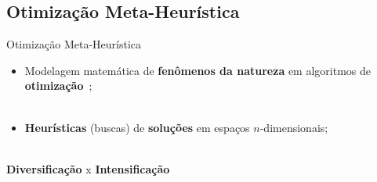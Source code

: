 \subsection{Otimização Meta-Heurística}
\label{ss.optimization_mh}

\begin{frame}{Otimização Meta-Heurística}
	\begin{itemize}
		\justifying
		\item Modelagem matemática de \textbf{fenômenos da natureza} em algoritmos de \textbf{otimização}~\cite{yang_review};
		\\~\\
		\item \textbf{Heurísticas} (buscas) de \textbf{soluções} em espaços $n$-dimensionais;
		\\~\\
	\end{itemize}
	\vspace*{0.5cm}
	\begin{block}{}
		\centering
		\textbf{Diversificação} x \textbf{Intensificação}
	\end{block}	
\end{frame}